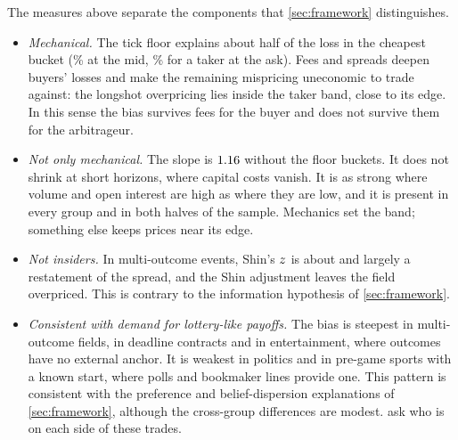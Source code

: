 The measures above separate the components that \cref{sec:framework} distinguishes.
\begin{itemize}
\item \emph{Mechanical.} The tick floor explains about half of the loss in the cheapest bucket
      (\xsFloorAllMechShare\% at the mid, \xsFloorTakerMechShare\% for a taker at the ask). Fees and
      spreads deepen buyers' losses and make the remaining mispricing uneconomic to trade against:
      the longshot overpricing lies inside the taker band, close to its edge. In this sense the bias
      survives fees for the buyer and does not survive them for the arbitrageur.
\item \emph{Not only mechanical.} The slope is $1.16$ without the floor buckets. It does
      not shrink at short horizons, where capital costs vanish. It is as strong where volume and open
      interest are high as where they are low, and it is present in every group and in both halves of
      the sample. Mechanics set the band; something else keeps prices near its edge.
\item \emph{Not insiders.} In multi-outcome events, Shin's $z$ is about \xsMeMultiZMedian{} and
      largely a restatement of the spread, and the Shin adjustment leaves the field overpriced. This
      is contrary to the information hypothesis of \cref{sec:framework}.
\item \emph{Consistent with demand for lottery-like payoffs.} The bias is steepest in multi-outcome
      fields, in deadline contracts and in entertainment, where outcomes have no external anchor. It
      is weakest in politics and in pre-game sports with a known start, where polls and bookmaker
      lines provide one. This pattern is consistent with the preference and belief-dispersion
      explanations of \cref{sec:framework}, although the cross-group differences are modest.  ask who is on each side of
      these trades.
\end{itemize}
